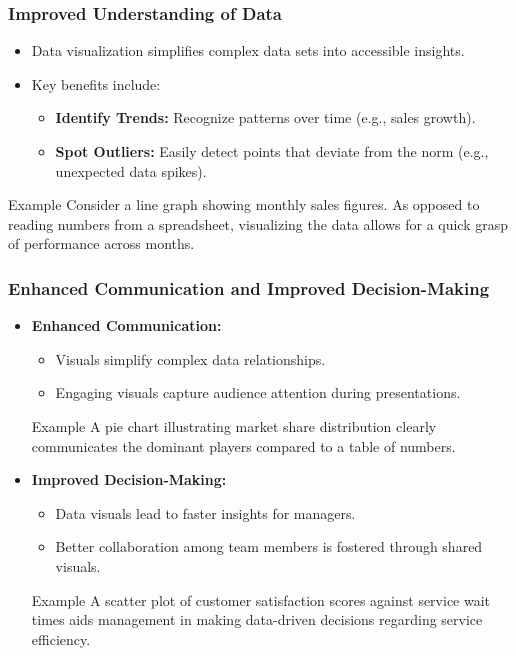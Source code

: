 \documentclass[aspectratio=169]{beamer}
\begin{document}
\begin{frame}[fragile]
    \frametitle{Improved Understanding of Data}
    \begin{itemize}
        \item Data visualization simplifies complex data sets into accessible insights.
        \item Key benefits include:
        \begin{itemize}
            \item \textbf{Identify Trends:} Recognize patterns over time (e.g., sales growth).
            \item \textbf{Spot Outliers:} Easily detect points that deviate from the norm (e.g., unexpected data spikes).
        \end{itemize}
    \end{itemize}
    \begin{block}{Example}
        Consider a line graph showing monthly sales figures. As opposed to reading numbers from a spreadsheet, visualizing the data allows for a quick grasp of performance across months.
    \end{block}
\end{frame}

\begin{frame}[fragile]
    \frametitle{Enhanced Communication and Improved Decision-Making}
    \begin{itemize}
        \item \textbf{Enhanced Communication:}
        \begin{itemize}
            \item Visuals simplify complex data relationships.
            \item Engaging visuals capture audience attention during presentations.
        \end{itemize}
        \begin{block}{Example}
            A pie chart illustrating market share distribution clearly communicates the dominant players compared to a table of numbers.
        \end{block}
        
        \item \textbf{Improved Decision-Making:}
        \begin{itemize}
            \item Data visuals lead to faster insights for managers.
            \item Better collaboration among team members is fostered through shared visuals.
        \end{itemize}
        \begin{block}{Example}
            A scatter plot of customer satisfaction scores against service wait times aids management in making data-driven decisions regarding service efficiency.
        \end{block}
    \end{itemize}
\end{frame}
\end{document}
